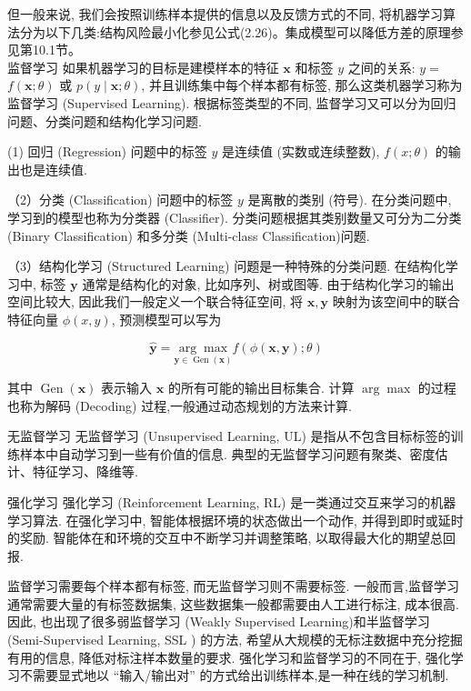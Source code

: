 \documentclass[10pt]{article}
\begin{document}
但一般来说, 我们会按照训练样本提供的信息以及反馈方式的不同, 将机器学习算法分为以下几类:结构风险最小化参见公式(2.26)。集成模型可以降低方差的原理参见第10.1节。\\
监督学习 如果机器学习的目标是建模样本的特征 $\boldsymbol{x}$ 和标签 $y$ 之间的关系: $y=$ $f(\boldsymbol{x} ; \theta)$ 或 $p(y \mid \boldsymbol{x} ; \theta)$, 并且训练集中每个样本都有标签, 那么这类机器学习称为监督学习 (Supervised Learning). 根据标签类型的不同, 监督学习又可以分为回归问题、分类问题和结构化学习问题.

(1) 回归 (Regression) 问题中的标签 $y$ 是连续值 (实数或连续整数), $f(x ; \theta)$ 的输出也是连续值.

（2）分类 (Classification) 问题中的标签 $y$ 是离散的类别 (符号). 在分类问题中, 学习到的模型也称为分类器 (Classifier). 分类问题根据其类别数量又可分为二分类 (Binary Classification) 和多分类 (Multi-class Classification)问题.

（3）结构化学习 (Structured Learning) 问题是一种特殊的分类问题. 在结构化学习中, 标签 $\boldsymbol{y}$ 通常是结构化的对象, 比如序列、树或图等. 由于结构化学习的输出空间比较大, 因此我们一般定义一个联合特征空间, 将 $\boldsymbol{x}, \boldsymbol{y}$ 映射为该空间中的联合特征向量 $\phi(x, y)$, 预测模型可以写为


\begin{equation*}
\hat{\boldsymbol{y}}=\underset{\boldsymbol{y} \in \operatorname{Gen}(\boldsymbol{x})}{\arg \max } f(\phi(\boldsymbol{x}, \boldsymbol{y}) ; \theta) \tag{2.71}
\end{equation*}


其中 $\operatorname{Gen}(\boldsymbol{x})$ 表示输入 $\boldsymbol{x}$ 的所有可能的输出目标集合. 计算 $\arg \max$ 的过程也称为解码 (Decoding) 过程,一般通过动态规划的方法来计算.

无监督学习 无监督学习 (Unsupervised Learning, UL) 是指从不包含目标标签的训练样本中自动学习到一些有价值的信息. 典型的无监督学习问题有聚类、密度估计、特征学习、降维等.

强化学习 强化学习 (Reinforcement Learning, RL) 是一类通过交互来学习的机器学习算法. 在强化学习中, 智能体根据环境的状态做出一个动作, 并得到即时或延时的奖励. 智能体在和环境的交互中不断学习并调整策略, 以取得最大化的期望总回报.

监督学习需要每个样本都有标签, 而无监督学习则不需要标签. 一般而言,监督学习通常需要大量的有标签数据集, 这些数据集一般都需要由人工进行标注, 成本很高. 因此, 也出现了很多弱监督学习 (Weakly Supervised Learning)和半监督学习 (Semi-Supervised Learning, SSL ) 的方法, 希望从大规模的无标注数据中充分挖掘有用的信息, 降低对标注样本数量的要求. 强化学习和监督学习的不同在于, 强化学习不需要显式地以 “输入/输出对” 的方式给出训练样本,是一种在线的学习机制.
\end{document}
